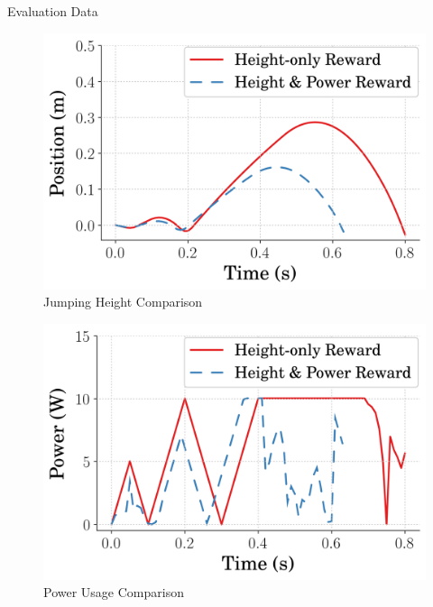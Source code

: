 \documentclass[final]{beamer}
\newlength{\onecolwid}
\newlength{\twocolwid}
\begin{document}
\begin{frame}[t]
\begin{columns}[t]
\begin{column}{\twocolwid}
\begin{columns}[t,totalwidth=\twocolwid]
\begin{column}{\onecolwid}
\begin{block}{Evaluation Data}
%
    \begin{figure}[tb]
        \captionsetup{justification=centering, labelformat=simple}
        \vspace{0.5in}
                \begin{center}
                    \includegraphics[width = \columnwidth]{figures/PosVsTime_2021-03-22_133925.png}
                    \caption{\:Jumping Height Comparison}
                    \label{fig:Jumping Height Comparison}
                \end{center}
        \vspace{-0.2in}
    \end{figure}
    \begin{figure}[tb]
        \captionsetup{justification=centering, labelformat=simple}
        \vspace{0.5in}
                \begin{center}
                    \includegraphics[width = \columnwidth]{figures/PowVsTime_2021-03-22_133929.png}
                    \caption{\:Power Usage Comparison}
                    \label{fig:Power Usage Comparison}
                \end{center}
        \vspace{-0.2in}
    \end{figure}


\end{block}
\end{column}
\end{columns}
\end{column}
\end{columns}
\end{frame}
\end{document}
